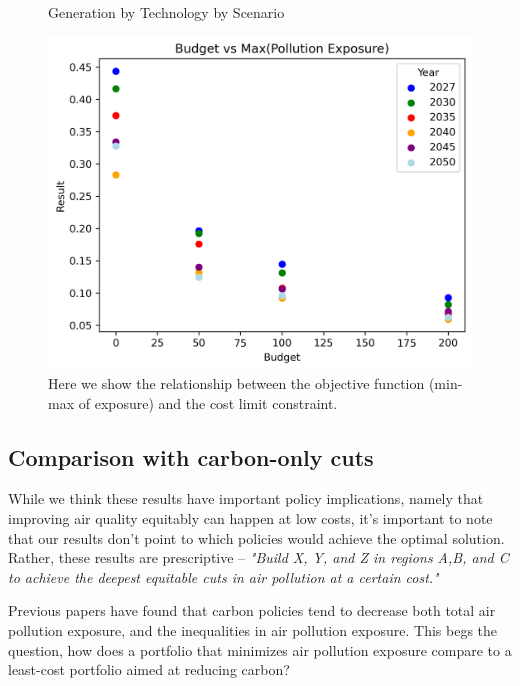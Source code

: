 \documentclass[a4paper]{article}
\theoremstyle{definition}
\theoremstyle{plain}
\begin{document}
\begin{figure}
    \\
    \caption{Generation by Technology by Scenario}
\end{figure}

\begin{figure}
    \centering
    \includegraphics[width=0.7\linewidth]{Figures/EndogenousResults/current_policies_short/exposure_cost_PPF.png}
    \caption{Here we show the relationship between the objective function (min-max of exposure) and the cost limit constraint.}
    \label{PPF}
\end{figure}

\subsection{Comparison with carbon-only cuts}
While we think these results have important policy implications, namely that improving air quality equitably can happen at low costs, it's important to note that our results don't point to which policies would achieve the optimal solution. Rather, these results are prescriptive -- \textit{"Build X, Y, and Z in regions A,B, and C to achieve the deepest equitable cuts in air pollution at a certain cost."} 

Previous papers have found that carbon policies tend to decrease both total air pollution exposure, and the inequalities in air pollution exposure. This begs the question, how does a portfolio that minimizes air pollution exposure compare to a least-cost portfolio aimed at reducing carbon?
\end{document}
